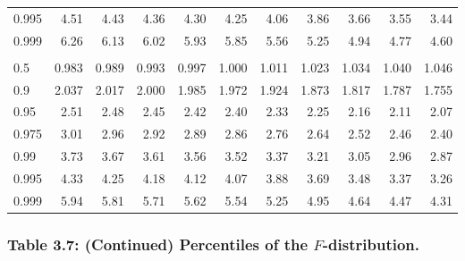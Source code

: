 \documentclass[]{article}
\begin{document}
\begin{table}[H]
\begin{tabular}{lrrrrrrrrrr}
\hspace{1em}0.995 & 4.51 & 4.43 & 4.36 & 4.30 & 4.25 & 4.06 & 3.86 & 3.66 & 3.55 & 3.44\\
\hspace{1em}0.999 & 6.26 & 6.13 & 6.02 & 5.93 & 5.85 & 5.56 & 5.25 & 4.94 & 4.77 & 4.60\\
\addlinespace[0.3em]
\multicolumn{11}{l}{\textbf{$k_2=15$}}\\
\hspace{1em}0.5 & 0.983 & 0.989 & 0.993 & 0.997 & 1.000 & 1.011 & 1.023 & 1.034 & 1.040 & 1.046\\
\hspace{1em}0.9 & 2.037 & 2.017 & 2.000 & 1.985 & 1.972 & 1.924 & 1.873 & 1.817 & 1.787 & 1.755\\
\hspace{1em}0.95 & 2.51 & 2.48 & 2.45 & 2.42 & 2.40 & 2.33 & 2.25 & 2.16 & 2.11 & 2.07\\
\hspace{1em}0.975 & 3.01 & 2.96 & 2.92 & 2.89 & 2.86 & 2.76 & 2.64 & 2.52 & 2.46 & 2.40\\
\hspace{1em}0.99 & 3.73 & 3.67 & 3.61 & 3.56 & 3.52 & 3.37 & 3.21 & 3.05 & 2.96 & 2.87\\
\hspace{1em}0.995 & 4.33 & 4.25 & 4.18 & 4.12 & 4.07 & 3.88 & 3.69 & 3.48 & 3.37 & 3.26\\
\hspace{1em}0.999 & 5.94 & 5.81 & 5.71 & 5.62 & 5.54 & 5.25 & 4.95 & 4.64 & 4.47 & 4.31\\
\bottomrule
\end{tabular}
\end{table}

\hypertarget{table-3.7-continued-percentiles-of-the-f-distribution.}{%
\subsubsection{\texorpdfstring{Table 3.7: (Continued) Percentiles of the
\(F\)-distribution.}{Table 3.7: (Continued) Percentiles of the F-distribution.}}\label{table-3.7-continued-percentiles-of-the-f-distribution.}}
\end{document}
